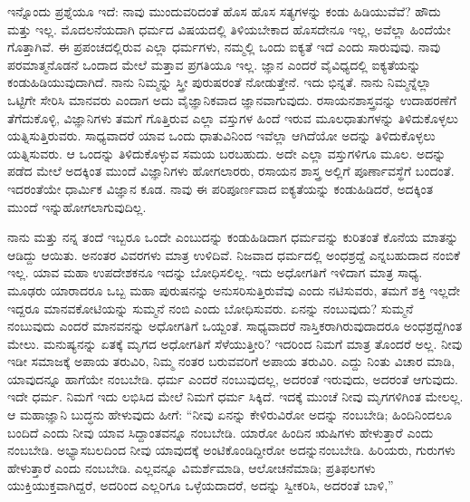 ಇನ್ನೊಂದು ಪ್ರಶ್ನೆಯೂ ಇದೆ: ನಾವು ಮುಂದುವರಿದಂತೆ ಹೊಸ ಹೊಸ ಸತ್ಯಗಳನ್ನು ಕಂಡು ಹಿಡಿಯುವೆವೆ? ಹೌದು ಮತ್ತು ಇಲ್ಲ. ಮೊದಲನೆಯದಾಗಿ ಧರ್ಮದ ವಿಷಯದಲ್ಲಿ ತಿಳಿಯಬೇಕಾದ ಹೊಸದೇನೂ ಇಲ್ಲ, ಅವೆಲ್ಲಾ ಹಿಂದೆಯೇ ಗೊತ್ತಾಗಿವೆ. ಈ ಪ್ರಪಂಚದಲ್ಲಿರುವ ಎಲ್ಲಾ ಧರ್ಮಗಳು, ನಮ್ಮಲ್ಲಿ ಒಂದು ಐಕ್ಯತೆ ಇದೆ ಎಂದು ಸಾರುವುವು. ನಾವು ಪರಮಾತ್ಮನೊಡನೆ ಒಂದಾದ ಮೇಲೆ ಮತ್ತಾವ ಪ್ರಗತಿಯೂ ಇಲ್ಲ. ಜ್ಞಾನ ಎಂದರೆ ವೈವಿಧ್ಯದಲ್ಲಿ ಐಕ್ಯತೆಯನ್ನು ಕಂಡುಹಿಡಿಯುವುದಾಗಿದೆ. ನಾನು ನಿಮ್ಮನ್ನು ಸ್ತ್ರೀ ಪುರುಷರಂತೆ ನೋಡುತ್ತೇನೆ. ಇದು ಭಿನ್ನತೆ. ನಾನು ನಿಮ್ಮನ್ನೆಲ್ಲಾ ಒಟ್ಟಿಗೇ ಸೇರಿಸಿ ಮಾನವರು ಎಂದಾಗ ಅದು ವೈಜ್ಞಾನಿಕವಾದ ಜ್ಞಾನವಾಗುವುದು. ರಸಾಯನಶಾಸ್ತ್ರವನ್ನು ಉದಾಹರಣೆಗೆ ತೆಗೆದುಕೊಳ್ಳಿ, ವಿಜ್ಞಾನಿಗಳು ತಮಗೆ ಗೊತ್ತಿರುವ ಎಲ್ಲಾ ವಸ್ತುಗಳ ಹಿಂದೆ ಇರುವ ಮೂಲಧಾತುಗಳನ್ನು ತಿಳಿದುಕೊಳ್ಳಲು ಯತ್ನಿಸುತ್ತಿರುವರು. ಸಾಧ್ಯವಾದರೆ ಯಾವ ಒಂದು ಧಾತುವಿನಿಂದ ಇವೆಲ್ಲಾ ಆಗಿದೆಯೋ ಅದನ್ನು ತಿಳಿದುಕೊಳ್ಳಲು ಯತ್ನಿಸುವರು. ಆ ಒಂದನ್ನು ತಿಳಿದುಕೊಳ್ಳುವ ಸಮಯ ಬರಬಹುದು. ಅದೇ ಎಲ್ಲಾ ವಸ್ತುಗಳಿಗೂ ಮೂಲ. ಅದನ್ನು ಪಡೆದ ಮೇಲೆ ಅದಕ್ಕಿಂತ ಮುಂದೆ ವಿಜ್ಞಾನಿಗಳು ಹೋಗಲಾರರು, ರಸಾಯನ ಶಾಸ್ತ್ರ ಅಲ್ಲಿಗೆ ಪೂರ್ಣಾವಸ್ಥೆಗೆ ಬಂದಂತೆ. ಇದರಂತೆಯೇ ಧಾರ್ಮಿಕ ವಿಜ್ಞಾನ ಕೂಡ. ನಾವು ಈ ಪರಿಪೂರ್ಣವಾದ ಐಕ್ಯತೆಯನ್ನು ಕಂಡುಹಿಡಿದರೆ, ಅದಕ್ಕಿಂತ ಮುಂದೆ ಇನ್ನು\break ಹೋಗಲಾಗುವುದಿಲ್ಲ.

ನಾನು ಮತ್ತು ನನ್ನ ತಂದೆ ಇಬ್ಬರೂ ಒಂದೇ ಎಂಬುದನ್ನು ಕಂಡುಹಿಡಿದಾಗ ಧರ್ಮವನ್ನು ಕುರಿತಂತೆ ಕೊನೆಯ ಮಾತನ್ನು ಆಡಿದ್ದು ಆಯಿತು. ಅನಂತರ ವಿವರಗಳು ಮಾತ್ರ ಉಳಿದಿವೆ. ನಿಜವಾದ ಧರ್ಮದಲ್ಲಿ ಅಂಧಶ್ರದ್ದೆ ಎನ್ನಬಹುದಾದ ನಂಬಿಕೆ ಇಲ್ಲ. ಯಾವ ಮಹಾ ಉಪದೇಶಕನೂ ಇದನ್ನು ಬೋಧಿಸಲಿಲ್ಲ. ಇದು ಅಧೋಗತಿಗೆ ಇಳಿದಾಗ ಮಾತ್ರ ಸಾಧ್ಯ. ಮೂಢರು ಯಾರಾದರೂ ಒಬ್ಬ ಮಹಾ ಪುರುಷನನ್ನು ಅನುಸರಿಸುತ್ತಿರುವೆವು ಎಂದು ನಟಿಸುವರು, ತಮಗೆ ಶಕ್ತಿ ಇಲ್ಲದೇ ಇದ್ದರೂ ಮಾನವಕೋಟಿಯನ್ನು ಸುಮ್ಮನೆ ನಂಬಿ ಎಂದು ಬೋಧಿಸುವರು. ಏನನ್ನು ನಂಬುವುದು? ಸುಮ್ಮನೆ ನಂಬುವುದು ಎಂದರೆ ಮಾನವನನ್ನು ಅಧೋಗತಿಗೆ ಒಯ್ದಂತೆ. ಸಾಧ್ಯವಾದರೆ ನಾಸ್ತಿಕರಾಗಿರುವುದಾದರೂ ಅಂಧಶ್ರದ್ದೆಗಿಂತ ಮೇಲು. ಮನುಷ್ಯನನ್ನು ಏತಕ್ಕೆ ಮೃಗದ ಅಧೋಗತಿಗೆ ಸೆಳೆಯುತ್ತೀರಿ? ಇದರಿಂದ ನಿಮಗೆ ಮಾತ್ರ ತೊಂದರೆ ಅಲ್ಲ. ನೀವು ಇಡೀ ಸಮಾಜಕ್ಕೆ ಅಪಾಯ ತರುವಿರಿ, ನಿಮ್ಮ ನಂತರ ಬರುವವರಿಗೆ ಅಪಾಯ ತರುವಿರಿ. ಎದ್ದು ನಿಂತು ವಿಚಾರ ಮಾಡಿ, ಯಾವುದನ್ನೂ ಹಾಗೆಯೇ ನಂಬಬೇಡಿ. ಧರ್ಮ ಎಂದರೆ ನಂಬುವುದಲ್ಲ, ಅದರಂತೆ ಇರುವುದು, ಅದರಂತೆ ಆಗುವುದು. ಇದೇ ಧರ್ಮ. ನಿಮಗೆ ಇದು ಲಭಿಸಿದ ಮೇಲೆ ನಿಮಗೆ ಧರ್ಮ ಸಿಕ್ಕಿದೆ. ಇದಕ್ಕೆ ಮುಂಚೆ ನೀವು ಮೃಗಗಳಿಗಿಂತ ಮೇಲಲ್ಲ. ಆ ಮಹಾಜ್ಞಾನಿ ಬುದ್ಧನು ಹೇಳುವುದು ಹೀಗೆ: “ನೀವು ಏನನ್ನು ಕೇಳಿರುವಿರೋ ಅದನ್ನು ನಂಬಬೇಡಿ; ಹಿಂದಿನಿಂದಲೂ ಬಂದಿದೆ ಎಂದು ನೀವು ಯಾವ ಸಿದ್ದಾಂತವನ್ನೂ ನಂಬಬೇಡಿ. ಯಾರೋ ಹಿಂದಿನ ಋಷಿಗಳು ಹೇಳುತ್ತಾರೆ ಎಂದು ನಂಬಬೇಡಿ. ಅಭ್ಯಾಸಬಲದಿಂದ ನೀವು ಯಾವುದಕ್ಕೆ ಅಂಟಿಕೊಂಡಿದ್ದೀರೋ ಅದನ್ನು\break ನಂಬಬೇಡಿ. ಹಿರಿಯರು, ಗುರುಗಳು ಹೇಳುತ್ತಾರೆ ಎಂದು ನಂಬಬೇಡಿ. ಎಲ್ಲವನ್ನೂ ವಿಮರ್ಶೆಮಾಡಿ, ಆಲೋಚನೆಮಾಡಿ; ಪ್ರತಿಫಲಗಳು ಯುಕ್ತಿಯುಕ್ತವಾಗಿದ್ದರೆ, ಅದರಿಂದ ಎಲ್ಲರಿಗೂ ಒಳ್ಳೆಯದಾದರೆ, ಅದನ್ನು ಸ್ವೀಕರಿಸಿ, ಅದರಂತೆ ಬಾಳಿ,''

